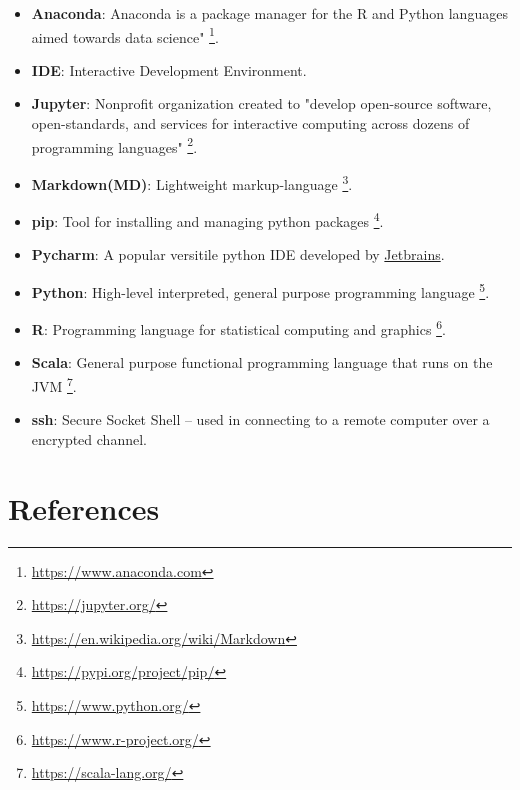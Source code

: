 \documentclass[pdftex,12pt]{artikel3}
\begin{document}
\begin{itemize}[label={}]
\item {\bf Anaconda}: Anaconda is a package manager for the R and Python languages aimed towards data science" \footnote{\url{ https://www.anaconda.com}}.\\
\item {\bf IDE}: Interactive Development Environment.\\
\item {\bf Jupyter}: Nonprofit organization created to "develop open-source software, open-standards, and services for interactive computing across dozens of programming languages" \footnote{\url{ https://jupyter.org/}}.\\
\item {\bf Markdown(MD)}: Lightweight markup-language \footnote{\url{https://en.wikipedia.org/wiki/Markdown}}.\\
\item {\bf pip}: Tool for installing and managing python packages \footnote{\url{ https://pypi.org/project/pip/}}.\\
\item {\bf Pycharm}: A popular versitile python IDE developed by \href{https://www.jetbrains.com/}{Jetbrains}.\\
\item {\bf Python}: High-level interpreted, general purpose programming language \footnote{\url{ https://www.python.org/}}.\\
\item {\bf R}: Programming language for statistical computing and graphics \footnote{\url{ https://www.r-project.org/}}.\\
\item {\bf Scala}: General purpose functional programming language that runs on the JVM \footnote{\url{ https://scala-lang.org/}}.\\
\item {\bf ssh}: Secure Socket Shell -- used in connecting to a remote computer over a encrypted channel.\\

\end{itemize}

\newpage

\section{References}
\end{document}
